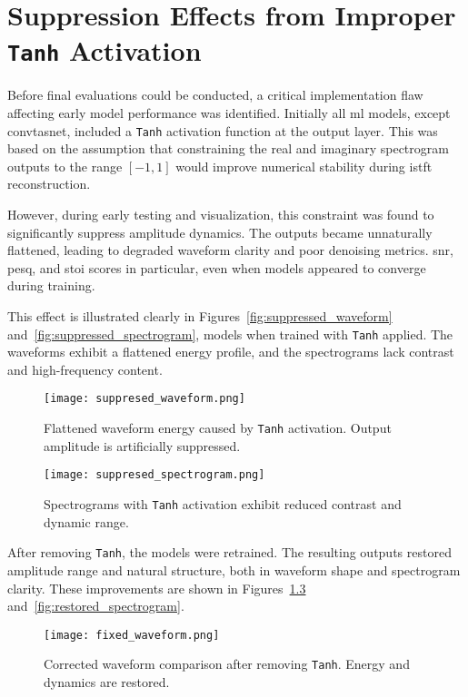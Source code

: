 \graphicspath{{content/appendices/figures}}
\chapter{Suppression Effects from Improper \texttt{Tanh} Activation}
\label{appendix:tanh_removal}

Before final evaluations could be conducted, a critical implementation flaw affecting early model performance was identified. Initially all \gls{ml} models, except \gls{convtasnet}, included a \texttt{Tanh} activation function at the output layer. This was based on the assumption that constraining the real and imaginary spectrogram outputs to the range \([-1, 1]\) would improve numerical stability during \gls{istft} reconstruction.

However, during early testing and visualization, this constraint was found to significantly suppress amplitude dynamics. The outputs became unnaturally flattened, leading to degraded waveform clarity and poor denoising metrics. \gls{snr}, \gls{pesq}, and \gls{stoi} scores in particular, even when models appeared to converge during training.

This effect is illustrated clearly in Figures~\ref{fig:suppressed_waveform} and~\ref{fig:suppressed_spectrogram}, models when trained with \texttt{Tanh} applied. The waveforms exhibit a flattened energy profile, and the spectrograms lack contrast and high-frequency content.

\begin{figure}[H]
    \centering
    \texttt{[image: suppresed\_waveform.png]}
    \caption{\label{fig:suppresed_waveform} Flattened waveform energy caused by \texttt{Tanh} activation. Output amplitude is artificially suppressed.}
\end{figure}

\begin{figure}[H]
    \centering
    \texttt{[image: suppresed\_spectrogram.png]}
    \caption{\label{fig:suppresed_spectrogram} Spectrograms with \texttt{Tanh} activation exhibit reduced contrast and dynamic range.}
\end{figure}

After removing \texttt{Tanh}, the models were retrained. The resulting outputs restored amplitude range and natural structure, both in waveform shape and spectrogram clarity. These improvements are shown in Figures~\ref{fig:restored_waveform} and~\ref{fig:restored_spectrogram}.

\begin{figure}[H]
    \centering
    \texttt{[image: fixed\_waveform.png]}
    \caption{\label{fig:restored_waveform} Corrected waveform comparison after removing \texttt{Tanh}. Energy and dynamics are restored.}
\end{figure}

